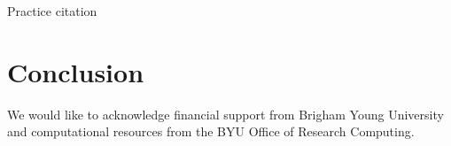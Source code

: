 \documentclass[journal=mamobx, layout=twocolumn]{achemso}
\begin{document}
Practice citation~\cite{Tree2018}


\section{Conclusion}

\begin{acknowledgement}
We would like to acknowledge financial support from Brigham Young University and computational resources from the BYU Office of Research Computing.
\end{acknowledgement}


\end{document}
